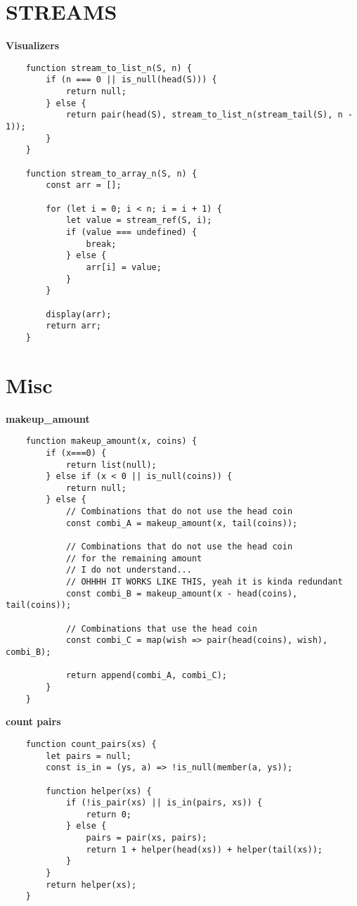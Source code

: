 \documentclass[a4paper]{article} \usepackage[backend=biber, style=numeric, sorting=none]{biblatex}
\begin{document}
\hrulefill

\section*{STREAMS}

\textbf{Visualizers}

\begin{verbatim}
    function stream_to_list_n(S, n) {
        if (n === 0 || is_null(head(S))) {
            return null;
        } else {
            return pair(head(S), stream_to_list_n(stream_tail(S), n - 1));
        }
    }
    
    function stream_to_array_n(S, n) {
        const arr = [];
        
        for (let i = 0; i < n; i = i + 1) {
            let value = stream_ref(S, i);
            if (value === undefined) {
                break;
            } else {
                arr[i] = value;
            }
        }
    
        display(arr);
        return arr;
    }
\end{verbatim}

\hrulefill
\pagebreak

\section*{Misc}

\textbf{makeup\_amount}

\begin{verbatim}
    function makeup_amount(x, coins) {
        if (x===0) {
            return list(null);
        } else if (x < 0 || is_null(coins)) {
            return null;
        } else {
            // Combinations that do not use the head coin
            const combi_A = makeup_amount(x, tail(coins));
            
            // Combinations that do not use the head coin
            // for the remaining amount
            // I do not understand...
            // OHHHH IT WORKS LIKE THIS, yeah it is kinda redundant
            const combi_B = makeup_amount(x - head(coins), tail(coins));
            
            // Combinations that use the head coin
            const combi_C = map(wish => pair(head(coins), wish), combi_B);
            
            return append(combi_A, combi_C);
        }
    }
\end{verbatim}

\textbf{count pairs}

\begin{verbatim}
    function count_pairs(xs) {
        let pairs = null;
        const is_in = (ys, a) => !is_null(member(a, ys));
        
        function helper(xs) {
            if (!is_pair(xs) || is_in(pairs, xs)) {
                return 0;
            } else {
                pairs = pair(xs, pairs);
                return 1 + helper(head(xs)) + helper(tail(xs));
            }
        }
        return helper(xs);
    }
\end{verbatim}
\end{document}
